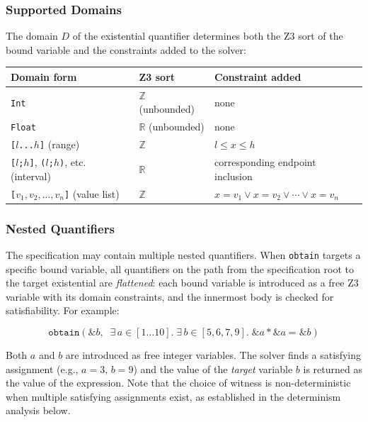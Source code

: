 \documentclass{article}
\begin{document}
\subsubsection*{Supported Domains}

The domain $D$ of the existential quantifier determines both the Z3 sort of the bound variable and the constraints added to the solver:

\begin{center}
\renewcommand{\arraystretch}{1.4}
\begin{tabular}{|l|l|l|}
\hline
\textbf{Domain form} & \textbf{Z3 sort} & \textbf{Constraint added} \\
\hline
\texttt{Int} & $\mathbb{Z}$ (unbounded) & none \\
\texttt{Float} & $\mathbb{R}$ (unbounded) & none \\
\texttt{[$l$...$h$]} (range) & $\mathbb{Z}$ & $l \leq x \leq h$ \\
\texttt{[$l$;$h$]}, \texttt{($l$;$h$)}, etc. (interval) & $\mathbb{R}$ & corresponding endpoint inclusion \\
\texttt{[$v_1, v_2, \ldots, v_n$]} (value list) & $\mathbb{Z}$ & $x = v_1 \lor x = v_2 \lor \cdots \lor x = v_n$ \\
\hline
\end{tabular}
\end{center}

\subsubsection*{Nested Quantifiers}

The specification may contain multiple nested quantifiers. When \texttt{obtain} targets a specific bound variable, all quantifiers on the path from the specification root to the target existential are \emph{flattened}: each bound variable is introduced as a free Z3 variable with its domain constraints, and the innermost body is checked for satisfiability. For example:

\[
\mathtt{obtain}(\texttt{\&}b,\;\; \exists\, a \in [1\ldots 10].\; \exists\, b \in [5,6,7,9].\; \texttt{\&}a * \texttt{\&}a = \texttt{\&}b)
\]

Both $a$ and $b$ are introduced as free integer variables. The solver finds a satisfying assignment (e.g., $a = 3,\, b = 9$) and the value of the \emph{target} variable $b$ is returned as the value of the expression. Note that the choice of witness is non-deterministic when multiple satisfying assignments exist, as established in the determinism analysis below.
\end{document}
